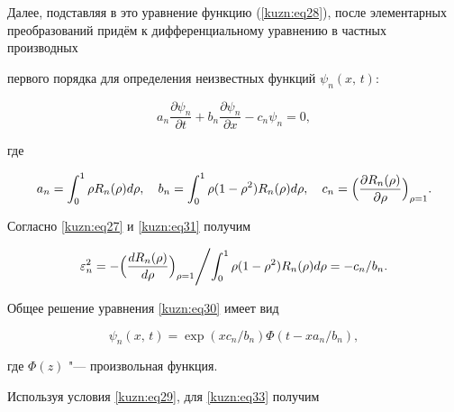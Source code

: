 Далее, подставляя в это уравнение функцию (\ref{kuzn:eq28}), после элементарных преобразований придём к дифференциальному уравнению в частных производных

первого порядка для определения неизвестных функций $\psi_n(x,\, t)$:

\begin{equation}

\label{kuzn:eq30}

a_n \frac{\partial \psi _n }{\partial t}+b_n

\frac{\partial \psi _n }{\partial x}-c_n \psi _n =0,

\end{equation}

где 

\begin{equation}

\label{kuzn:eq31}

a_n =\int_0^1 \rho R_n (\rho )d\rho,\quad 

b_n =\int_0^1 \rho (1-\rho ^2)R_n (\rho )d\rho,\quad 

c_n =\Bigl( \frac{\partial R_n (\rho )}{\partial \rho }

\Bigr)_{\rho =1}.

\end{equation}

Согласно \eqref{kuzn:eq27} и \eqref{kuzn:eq31} получим

\begin{equation}

\label{kuzn:eq32}

\varepsilon _n^2 =-\Bigl(\frac{dR_n (\rho )}{d\rho } \Bigr) _{\rho =1} \Bigg /

{\int_0^1 \rho (1-\rho ^2)R_n (\rho )d\rho } =-{c_n }/{b_n }.

\end{equation}



Общее решение уравнения \eqref{kuzn:eq30} имеет вид

\begin{equation}

\label{kuzn:eq33}

\psi_n(x,\,t) = \exp(x c_n/b_n) \Phi (t-x a_n/b_n),

\end{equation}

где $\Phi (z)$ "--- произвольная функция.

Используя условия \eqref{kuzn:eq29}, для \eqref{kuzn:eq33} получим

